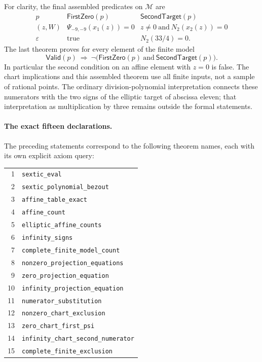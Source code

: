 For clarity, the final assembled predicates on $\mathcal M$ are
\[
 \begin{array}{c|c|c}
 p&\mathsf{FirstZero}(p)&\mathsf{SecondTarget}(p)\\ \hline
 (z,W)&\Psi_{-9,-9}(x_1(z))=0&
             z\ne0\ \text{and}\ N_2(x_2(z))=0\\
 \varepsilon&\text{true}&N_2(33/4)=0 .
 \end{array}
\]
The last theorem proves for every element of the finite model
\[
 \mathsf{Valid}(p)\ \Longrightarrow\
 \neg\bigl(\mathsf{FirstZero}(p)\ \text{and}\
                 \mathsf{SecondTarget}(p)\bigr).
\]
In particular the second condition on an affine element with $z=0$
is false. The chart implications and this assembled theorem use
all finite inputs, not a sample of rational points. The ordinary
division-polynomial interpretation connects these numerators with
the two signs of the elliptic target of abscissa eleven; that
interpretation as multiplication by three remains outside the
formal statements.

\paragraph{The exact fifteen declarations.}
The preceding statements correspond to the following theorem names,
each with its own explicit axiom query:
\begin{center}
\small
\begin{tabular}{r l}
1&\texttt{sextic\_eval}\\
2&\texttt{sextic\_polynomial\_bezout}\\
3&\texttt{affine\_table\_exact}\\
4&\texttt{affine\_count}\\
5&\texttt{elliptic\_affine\_counts}\\
6&\texttt{infinity\_signs}\\
7&\texttt{complete\_finite\_model\_count}\\
8&\texttt{nonzero\_projection\_equations}\\
9&\texttt{zero\_projection\_equation}\\
10&\texttt{infinity\_projection\_equation}\\
11&\texttt{numerator\_substitution}\\
12&\texttt{nonzero\_chart\_exclusion}\\
13&\texttt{zero\_chart\_first\_psi}\\
14&\texttt{infinity\_chart\_second\_numerator}\\
15&\texttt{complete\_finite\_exclusion}
\end{tabular}
\end{center}

